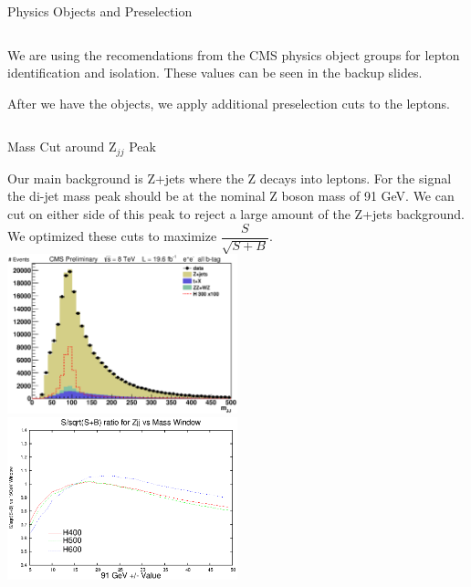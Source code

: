 \begin{frame}{Physics Objects and Preselection}
\begin{columns}
\begin{column}{0.6\textwidth}
\vspace{2em}
We are using the recomendations from the CMS physics object groups for lepton identification and isolation.  These values can be seen in the backup slides.

\vspace{1em}

After we have the objects, we apply additional preselection cuts to the leptons.

\end{column}
\end{columns}
\end{frame}


\begin{frame}{Mass Cut around Z$_{jj}$ Peak}
\begin{center}
Our main background is Z+jets where the Z decays into leptons.  For the signal the di-jet mass peak should be at the nominal Z boson mass of 91 GeV.  We can cut on either side of this peak to reject a large amount of the Z+jets background. We optimized these cuts to maximize $\dfrac{S}{\sqrt{S+B}}$.
\\
\includegraphics[width=0.5\textwidth]{images/preselection/el/mJJ.eps}
\includegraphics[width=0.5\textwidth]{images/test_zjj_s_sb_zero.eps}
\end{center}
\end{frame}

